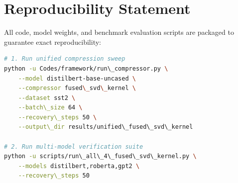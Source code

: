 \section{Reproducibility Statement}
All code, model weights, and benchmark evaluation scripts are packaged to guarantee exact reproducibility:
\begin{lstlisting}[language=bash]
# 1. Run unified compression sweep
python -u Codes/framework/run\_compressor.py \
    --model distilbert-base-uncased \
    --compressor fused\_svd\_kernel \
    --dataset sst2 \
    --batch\_size 64 \
    --recovery\_steps 50 \
    --output\_dir results/unified\_fused\_svd\_kernel

# 2. Run multi-model verification suite
python -u scripts/run\_all\_4\_fused\_svd\_kernel.py \
    --models distilbert,roberta,gpt2 \
    --recovery\_steps 50
\end{lstlisting}
